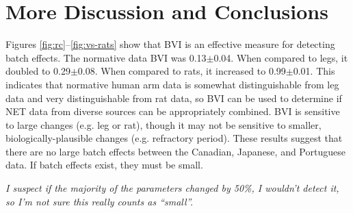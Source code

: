 \documentclass[12pt]{article}
\begin{document}
\pagebreak

\section*{More Discussion and Conclusions}

Figures \ref{fig:rc}–\ref{fig:vs-rats} show that BVI is an effective measure for detecting batch effects. The normative data BVI was 0.13$\pm$0.04. When compared to legs, it doubled to 0.29$\pm$0.08. When compared to rats, it increased to 0.99$\pm$0.01. This indicates that normative human arm data is somewhat distinguishable from leg data and very distinguishable from rat data, so BVI can be used to determine if NET data from diverse sources can be appropriately combined. BVI is sensitive to large changes (e.g. leg or rat), though it may not be sensitive to smaller, biologically-plausible changes (e.g. refractory period). These results suggest that there are no large batch effects between the Canadian, Japanese, and Portuguese data. If batch effects exist, they must be small.

\emph{I suspect if the majority of the parameters changed by 50\%, I wouldn't detect it, so I'm not sure this really counts as ``small''.}
\end{document}
